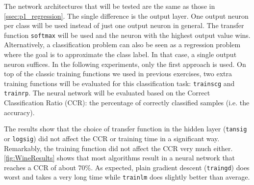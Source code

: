 \documentclass[a4, 10pt, twoside, twocolumn]{article}
\numberwithin{figure}{section}
\begin{document}
The network architectures that will be tested are the same as those in \autoref{ssec:p1_regression}. The single difference is the output layer. One output neuron per class will be used instead of just one output neuron in general. The transfer function \texttt{softmax} will be used and the neuron with the highest output value wins. Alternatively, a classification problem can also be seen as a regression problem where the goal is to approximate the class label. In that case, a single output neuron suffices. In the following experiments, only the first approach is used. On top of the classic training functions we used in previous exercises, two extra training functions will be evaluated for this classification task: \texttt{trainscg} and \texttt{trainrp}. The neural network will be evaluated based on the Correct Classification Ratio (CCR): the percentage of correctly classified samples (i.e. the accuracy). 


The results show that the choice of transfer function in the hidden layer (\texttt{tansig} or \texttt{logsig}) did not affect the CCR or training time in a significant way. Remarkably, the training function did not affect the CCR very much either. \autoref{fig:WineResults} shows that most algorithms result in a neural network that reaches a CCR of about 70\%. As expected, plain gradient descent (\texttt{traingd}) does worst and takes a very long time while \texttt{trainlm} does slightly better than average.
\end{document}
